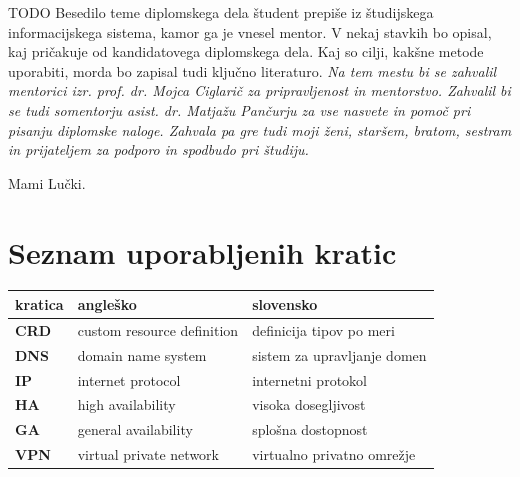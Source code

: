\documentclass[a4paper, 12pt]{book}
\newcommand{\clearemptydoublepage}{\newpage{\pagestyle{empty}\cleardoublepage}}
\begin{document}
TODO
Besedilo teme diplomskega dela študent prepiše iz študijskega informacijskega sistema, kamor ga je vnesel mentor. V nekaj stavkih bo opisal, kaj pričakuje od kandidatovega diplomskega dela. Kaj so cilji, kakšne metode uporabiti, morda bo zapisal tudi ključno literaturo.
\vspace{15mm}
\vspace{2cm}
\clearemptydoublepage
\thispagestyle{empty}\mbox{}\vfill\null\it%
\noindent
Na tem mestu bi se zahvalil mentorici izr. prof. dr. Mojca Ciglarič za pripravljenost in mentorstvo.
Zahvalil bi se tudi somentorju asist. dr. Matjažu Pančurju za vse nasvete in pomoč pri pisanju diplomske naloge.
Zahvala pa gre tudi moji ženi, staršem, bratom, sestram in prijateljem za podporo in spodbudo pri študiju.
\rm\normalfont
\clearemptydoublepage
\thispagestyle{empty}\mbox{}{\textheight}\mbox{}\hfill\begin{minipage}{0.55\textwidth}%
Mami Lučki.
\normalfont\end{minipage}
\clearemptydoublepage
\pagestyle{empty}
\def\thepage{}%
\tableofcontents{}
\clearemptydoublepage
\chapter*{Seznam uporabljenih kratic}  %
\noindent\begin{tabular}{p{}|p{}|p{}}    %
  {\bf kratica} & {\bf angleško}                             & {\bf slovensko} \\ \hline
  {\bf CRD} & custom resource definition & definicija tipov po meri \\
  {\bf DNS} & domain name system & sistem za upravljanje domen \\
  {\bf IP} & internet protocol & internetni protokol \\
  {\bf HA} & high availability & visoka dosegljivost \\
  {\bf GA} & general availability & splošna dostopnost \\
  {\bf VPN} & virtual private network & virtualno privatno omrežje \\
\end{tabular}
\clearemptydoublepage
\end{document}
